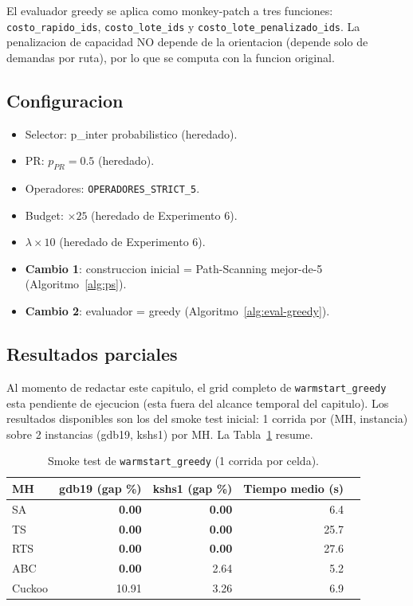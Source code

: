 El evaluador greedy se aplica como monkey-patch a tres funciones:
\texttt{costo\_rapido\_ids}, \texttt{costo\_lote\_ids} y
\texttt{costo\_lote\_penalizado\_ids}. La penalizacion de capacidad NO
depende de la orientacion (depende solo de demandas por ruta), por lo
que se computa con la funcion original.

\subsection{Configuracion}

\begin{itemize}
\item Selector: p\_inter probabilistico (heredado).
\item PR: $p_{PR} = 0.5$ (heredado).
\item Operadores: \texttt{OPERADORES\_STRICT\_5}.
\item Budget: $\times 25$ (heredado de Experimento 6).
\item $\lambda \times 10$ (heredado de Experimento 6).
\item \textbf{Cambio 1}: construccion inicial = Path-Scanning
  mejor-de-5 (Algoritmo~\ref{alg:ps}).
\item \textbf{Cambio 2}: evaluador = greedy
  (Algoritmo~\ref{alg:eval-greedy}).
\end{itemize}

\subsection{Resultados parciales}

Al momento de redactar este capitulo, el grid completo de
\texttt{warmstart\_greedy} esta pendiente de ejecucion (esta fuera del
alcance temporal del capitulo). Los resultados disponibles son los del
smoke test inicial: 1 corrida por (MH, instancia) sobre 2 instancias
(gdb19, kshs1) por MH. La Tabla~\ref{tab:wsgreedy-smoke} resume.

\begin{table}[h]
\centering
\caption{Smoke test de \texttt{warmstart\_greedy} (1 corrida por celda).}
\label{tab:wsgreedy-smoke}
\small
\begin{tabular}{lrrrr}
\toprule
MH & gdb19 (gap \%) & kshs1 (gap \%) & Tiempo medio (s) \\
\midrule
SA      & \textbf{0.00} & \textbf{0.00} &  6.4 \\
TS      & \textbf{0.00} & \textbf{0.00} & 25.7 \\
RTS     & \textbf{0.00} & \textbf{0.00} & 27.6 \\
ABC     & \textbf{0.00} & 2.64 &  5.2 \\
Cuckoo  & 10.91 & 3.26 &  6.9 \\
\bottomrule
\end{tabular}
\end{table}

